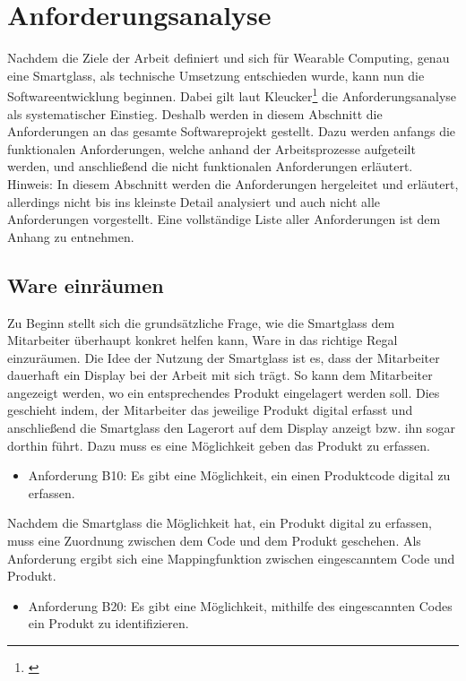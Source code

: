 \chapter{Anforderungsanalyse}
\label{annforderungnsanalyse}
Nachdem die Ziele der Arbeit definiert und sich für Wearable Computing, genau eine Smartglass, als technische Umsetzung entschieden wurde, kann nun die Softwareentwicklung beginnen. Dabei gilt laut Kleucker\footnote{\citep{anforderungsanalyse}} die Anforderungsanalyse als systematischer Einstieg. Deshalb werden in diesem Abschnitt die Anforderungen an das gesamte Softwareprojekt gestellt. Dazu werden anfangs die funktionalen Anforderungen, welche anhand der Arbeitsprozesse aufgeteilt werden, und anschließend die nicht funktionalen Anforderungen erläutert.\\
Hinweis: In diesem Abschnitt werden die Anforderungen hergeleitet und erläutert, allerdings nicht bis ins kleinste Detail analysiert und auch nicht alle Anforderungen vorgestellt. Eine vollständige Liste aller Anforderungen ist dem Anhang zu entnehmen.

\section{Ware einräumen}
Zu Beginn stellt sich die grundsätzliche Frage, wie die Smartglass dem Mitarbeiter überhaupt konkret helfen kann, Ware in das richtige Regal einzuräumen. Die Idee der Nutzung der Smartglass ist es, dass der Mitarbeiter dauerhaft ein Display bei der Arbeit mit sich trägt. So kann dem Mitarbeiter angezeigt werden, wo ein entsprechendes Produkt eingelagert werden soll. Dies geschieht indem, der Mitarbeiter das jeweilige Produkt digital erfasst und anschließend die Smartglass den Lagerort auf dem Display anzeigt bzw. ihn sogar dorthin führt. Dazu muss es eine Möglichkeit geben das Produkt zu erfassen. 

\begin{itemize}
	\item Anforderung B10: Es gibt eine Möglichkeit, ein einen Produktcode digital zu erfassen. \label{anforderung_b10}
\end{itemize}
Nachdem die Smartglass die Möglichkeit hat, ein Produkt digital zu erfassen, muss eine Zuordnung zwischen dem Code und dem Produkt geschehen. Als Anforderung ergibt sich eine Mappingfunktion zwischen eingescanntem Code und Produkt. 

\begin{itemize}
	\item Anforderung B20: Es gibt eine Möglichkeit, mithilfe des eingescannten Codes ein Produkt zu identifizieren. \label{anforderung_b20}
\end{itemize}

